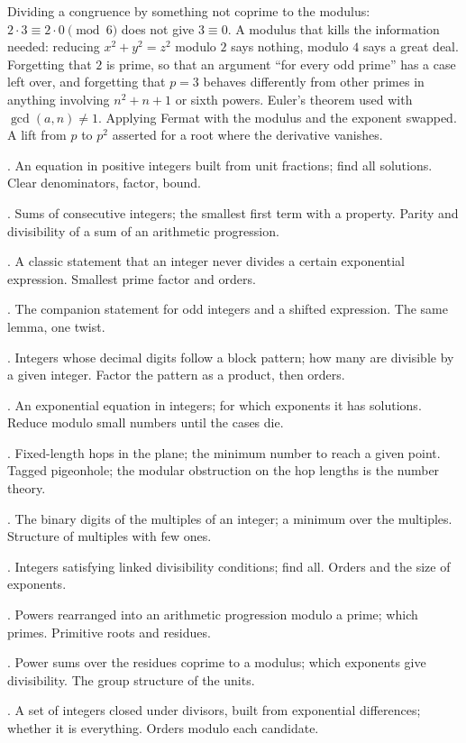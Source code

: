 \begin{trap}
Dividing a congruence by something not coprime to the modulus: $2 \cdot 3 \equiv 2 \cdot 0 \pmod 6$ does not give $3 \equiv 0$. A modulus that kills the information needed: reducing $x^2 + y^2 = z^2$ modulo $2$ says nothing, modulo $4$ says a great deal. Forgetting that $2$ is prime, so that an argument ``for every odd prime'' has a case left over, and forgetting that $p = 3$ behaves differently from other primes in anything involving $n^2 + n + 1$ or sixth powers. Euler's theorem used with $\gcd(a, n) \ne 1$. Applying Fermat with the modulus and the exponent swapped. A lift from $p$ to $p^2$ asserted for a root where the derivative vanishes.
\end{trap}

\begin{ladder}
\item {}. An equation in positive integers built from unit fractions; find all solutions. Clear denominators, factor, bound.
\item {}. Sums of consecutive integers; the smallest first term with a property. Parity and divisibility of a sum of an arithmetic progression.
\item {}. A classic statement that an integer never divides a certain exponential expression. Smallest prime factor and orders.
\item {}. The companion statement for odd integers and a shifted expression. The same lemma, one twist.
\item {}. Integers whose decimal digits follow a block pattern; how many are divisible by a given integer. Factor the pattern as a product, then orders.
\item {}. An exponential equation in integers; for which exponents it has solutions. Reduce modulo small numbers until the cases die.
\item {}. Fixed-length hops in the plane; the minimum number to reach a given point. Tagged pigeonhole; the modular obstruction on the hop lengths is the number theory.
\item {}. The binary digits of the multiples of an integer; a minimum over the multiples. Structure of multiples with few ones.
\item {}. Integers satisfying linked divisibility conditions; find all. Orders and the size of exponents.
\item {}. Powers rearranged into an arithmetic progression modulo a prime; which primes. Primitive roots and residues.
\item {}. Power sums over the residues coprime to a modulus; which exponents give divisibility. The group structure of the units.
\item {}. A set of integers closed under divisors, built from exponential differences; whether it is everything. Orders modulo each candidate.
\end{ladder}

